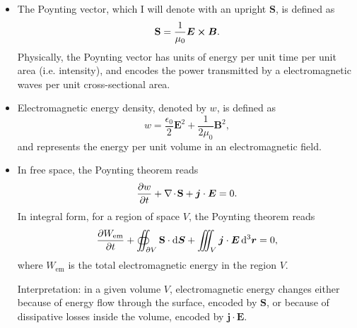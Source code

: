 \documentclass[11pt, a4paper]{article}
\newcommand{\diff}{\mathop{}\!\mathrm{d}} %
\newcommand{\dr}{\diff^{3} \r}  %
\renewcommand{\vec}[1]{\bm{#1}} %
\renewcommand{\r}{\vec{r}}
\newcommand{\E}{\vec{E}} %
\newcommand{\B}{\vec{B}} %
\renewcommand{\S}{\mathbf{S}}  %
\newcommand{\ee}{\epsilon_{0}}  %
\newcommand{\mm}{\mu_{0}}  %
\renewcommand{\j}{\vec{j}}  %
\renewcommand{\div}{\nabla \mspace{-2mu} \cdot \mspace{-2mu}}
\begin{document}
\begin{itemize}
    \item The Poynting vector, which I will denote with an upright $ \S $, is defined as
    \begin{equation*}
        \S = \frac{1}{\mm} \E \cross \B.
    \end{equation*}
    Physically, the Poynting vector has units of energy per unit time per unit area (i.e. intensity), and encodes the power transmitted by a electromagnetic waves per unit cross-sectional area.
    
    \item Electromagnetic energy density, denoted by $ w $, is defined as
    \begin{equation*}
        w = \frac{\ee}{2}\E^{2} + \frac{1}{2\mm} \B^{2},
    \end{equation*}
    and represents the energy per unit volume in an electromagnetic field.
    
    \item In free space, the Poynting theorem reads
    \begin{equation*}
        \pdv{w}{t} + \div \S + \j \cdot \E = 0.
    \end{equation*}
    In integral form, for a region of space $ V $, the Poynting theorem reads
    \begin{equation*}
        \pdv{W_{\text{em}}}{t} + \oiint_{\partial V} \S \cdot \diff \vec{S} + \iiint_{V} \j \cdot \E \dr = 0,
    \end{equation*}
    where $ W_{\text{em}} $ is the total electromagnetic energy in the region $ V $.

	Interpretation: in a given volume $ V $, electromagnetic energy changes either because of energy flow through the surface, encoded by $ \S $, or because of dissipative losses inside the volume, encoded by $ \j \cdot \E $. 
    
\end{itemize}
\end{document}
